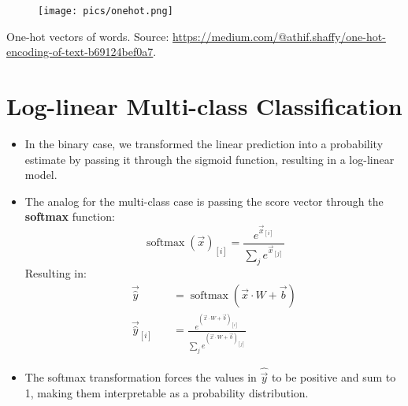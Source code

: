 \begin{figure}[htb]
	\centering
	 \texttt{[image: pics/onehot.png]}
\end{figure}

One-hot vectors of words. Source: \url{https://medium.com/@athif.shaffy/one-hot-encoding-of-text-b69124bef0a7}.




\section{Log-linear Multi-class Classification}
\begin{itemize}
\item In the binary case, we transformed the linear prediction into a probability estimate by passing it through the sigmoid function, resulting in a log-linear model.
\item The analog for the multi-class case is passing the score vector through the \textbf{softmax} function:
\begin{equation}
 \operatorname{softmax}(\vec{x})_{[i]} = \frac{e^{\vec{x}_{[i]}}}{\sum_j e^{\vec{x}_{[j]}}}
\end{equation}
Resulting in:
\begin{equation}
\begin{split}
\vec{\hat{y}} \quad & =  \operatorname{softmax}(\vec{x} \cdot W + \vec{b})  \\
\vec{\hat{y}}_{[i]} \quad & = \frac{e^{(\vec{x} \cdot W + \vec{b})_{[i]}}}{\sum_j e^{(\vec{x} \cdot W + \vec{b})_{[j]}}}
\end{split}
\end{equation}
\item The softmax transformation forces the values in $\hat{\vec{y}}$ to be positive and sum to 1, making them interpretable as a probability distribution.
\end{itemize}



